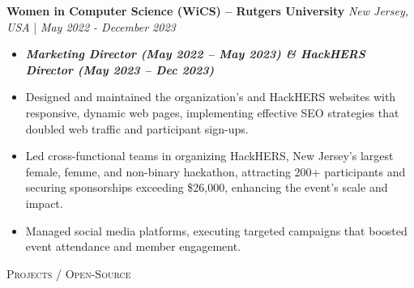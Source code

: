 \documentclass[a4paper]{article}
\newcommand{\lineunder} {
    \vspace*{-8pt} \\
    \hspace*{-18pt} \hrulefill \\
}
\newcommand{\header} [1] {
    {\hspace*{-18pt}\vspace*{6pt} \textsc{#1}}
    \vspace*{-6pt} \lineunder
}
\begin{document}
\vspace{-2mm}
\textbf{Women in Computer Science (WiCS) – Rutgers University  } \hfill  \textit{New Jersey, USA} | \textit{May 2022 - December 2023}
\vspace{-2.5mm}
\begin{itemize} \itemsep -4pt
     \item[] \textit{\textbf{Marketing Director (May 2022 – May 2023) \& HackHERS Director (May 2023 – Dec 2023)}}
     \item Designed and maintained the organization's and HackHERS websites with responsive, dynamic web pages, implementing effective SEO strategies that doubled web traffic and participant sign-ups.
    \item Led cross-functional teams in organizing HackHERS, New Jersey's largest female, femme, and non-binary hackathon, attracting 200+ participants and securing sponsorships exceeding \$26,000, enhancing the event's scale and impact.
    \item Managed social media platforms, executing targeted campaigns that boosted event attendance and member engagement.
\end{itemize}
\vspace{-2mm} 
%
%
\header{Projects / Open-Source}
\end{document}
